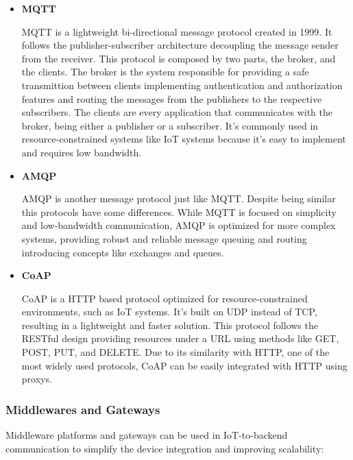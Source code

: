\begin{itemize}

	\item \textbf{MQTT}

	      MQTT is a lightweight bi-directional message protocol created in 1999.
	      It follows the publisher-subscriber architecture decoupling the message
	      sender from the receiver. This protocol is composed by two parts, the
	      broker, and the clients. The broker is the system responsible for providing
	      a safe transmittion between clients implementing authentication and
	      authorization features and routing the messages from the publishers to
	      the respective subscribers. The clients are every application that
	      communicates with the broker, being either a publisher or a subscriber.
	      It's commonly used in resource-constrained systems like IoT systems because
	      it's easy to implement and requires low bandwidth.

	\item \textbf{AMQP}

	      AMQP is another message protocol just like MQTT.
	      Despite being similar this protocols have some differences. While MQTT is
	      focused on simplicity and low-bandwidth communication, AMQP is optimized for
	      more complex systems, providing robust and reliable message queuing and
	      routing introducing concepts like exchanges and queues.


	\item \textbf{CoAP}

	      CoAP is a HTTP based protocol optimized for resource-constrained
	      environments, such as IoT systems. It's built on UDP instead of TCP,
	      resulting in a lightweight and faster solution.
	      This protocol follows the RESTful design providing resources under a URL
	      using methods like GET, POST, PUT, and DELETE. Due to its similarity with
	      HTTP, one of the most widely used protocols, CoAP can be easily integrated
	      with HTTP using proxys.

\end{itemize}

\subsubsection{Middlewares and Gateways}
Middleware platforms and gateways can be used in IoT-to-backend
communication to simplify the device integration and improving scalability:


